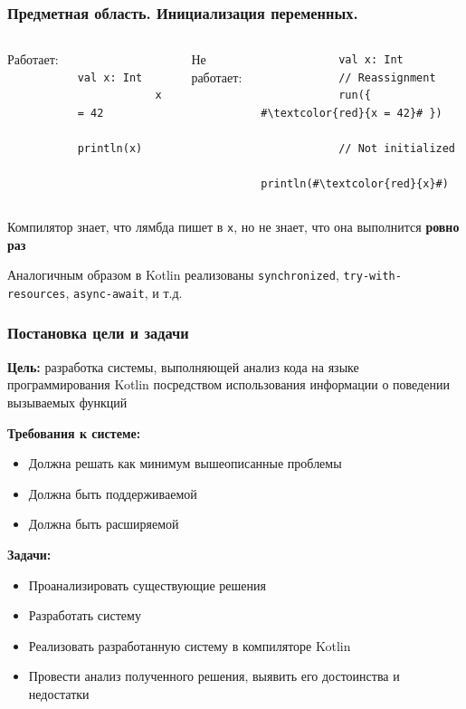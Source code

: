 \documentclass{beamer}
\newcommand{\code}[1]{\texttt{#1}}
\begin{document}
\begin{frame}[fragile]\frametitle{Предметная область. Инициализация переменных.}
    \begin{columns}[T]
        \setlength\partopsep{-\topsep}
        
        Работает:
        
        \begin{verbatim}
            val x: Int
            x = 42
            println(x)
        \end{verbatim}
        
        
        Не работает:
        
        \begin{verbatim}
            val x: Int
            // Reassignment
            run({ #\textcolor{red}{x = 42}# }) 
            
            // Not initialized
            println(#\textcolor{red}{x}#)      
        \end{verbatim}
        
    \end{columns}
    
    \bigskip
    
      Компилятор знает, что лямбда пишет в \code{x}, но не знает, что она выполнится \textbf{ровно раз}
    
    \bigskip 
    
    Аналогичным образом в Kotlin реализованы \code{synchronized}, \code{try-with-resources}, \code{async-await}, и т.д.
\end{frame}

\begin{frame}\frametitle{Постановка цели и задачи}
    \textbf{Цель:} разработка системы, выполняющей анализ кода на языке программирования Kotlin посредством использования информации о поведении вызываемых функций
    
    \textbf{Требования к системе:} 
    \begin{itemize}
        \item Должна решать как минимум вышеописанные проблемы
        \item Должна быть поддерживаемой
        \item Должна быть расширяемой
    \end{itemize}
    
    \textbf{Задачи:}
    \begin{itemize}
        \item Проанализировать существующие решения
        \item Разработать систему
        \item Реализовать разработанную систему в компиляторе Kotlin
        \item Провести анализ полученного решения, выявить его достоинства и недостатки
    \end{itemize}
\end{frame}
\end{document}
